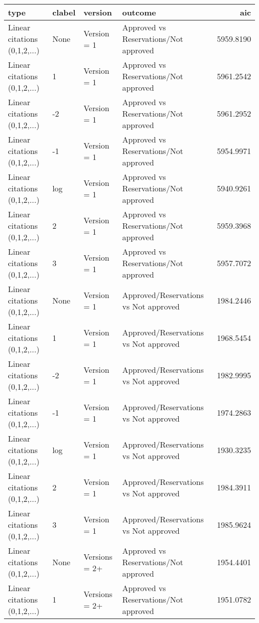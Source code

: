 \begin{table}[ht]
\centering
\begin{tabular}{llllr}
 type & clabel & version & outcome & aic \\ 
  \hline
Linear citations (0,1,2,...) & None & Version = 1 & Approved vs
Reservations/Not approved & 5959.8190 \\ 
  Linear citations (0,1,2,...) & 1 & Version = 1 & Approved vs
Reservations/Not approved & 5961.2542 \\ 
  Linear citations (0,1,2,...) & -2 & Version = 1 & Approved vs
Reservations/Not approved & 5961.2952 \\ 
  Linear citations (0,1,2,...) & -1 & Version = 1 & Approved vs
Reservations/Not approved & 5954.9971 \\ 
  Linear citations (0,1,2,...) & log & Version = 1 & Approved vs
Reservations/Not approved & 5940.9261 \\ 
  Linear citations (0,1,2,...) & 2 & Version = 1 & Approved vs
Reservations/Not approved & 5959.3968 \\ 
  Linear citations (0,1,2,...) & 3 & Version = 1 & Approved vs
Reservations/Not approved & 5957.7072 \\ 
  Linear citations (0,1,2,...) & None & Version = 1 & Approved/Reservations
vs Not approved & 1984.2446 \\ 
  Linear citations (0,1,2,...) & 1 & Version = 1 & Approved/Reservations
vs Not approved & 1968.5454 \\ 
  Linear citations (0,1,2,...) & -2 & Version = 1 & Approved/Reservations
vs Not approved & 1982.9995 \\ 
  Linear citations (0,1,2,...) & -1 & Version = 1 & Approved/Reservations
vs Not approved & 1974.2863 \\ 
  Linear citations (0,1,2,...) & log & Version = 1 & Approved/Reservations
vs Not approved & 1930.3235 \\ 
  Linear citations (0,1,2,...) & 2 & Version = 1 & Approved/Reservations
vs Not approved & 1984.3911 \\ 
  Linear citations (0,1,2,...) & 3 & Version = 1 & Approved/Reservations
vs Not approved & 1985.9624 \\ 
  Linear citations (0,1,2,...) & None & Versions = 2+ & Approved vs
Reservations/Not approved & 1954.4401 \\ 
  Linear citations (0,1,2,...) & 1 & Versions = 2+ & Approved vs
Reservations/Not approved & 1951.0782 \\ 

\end{tabular}
\end{table}
